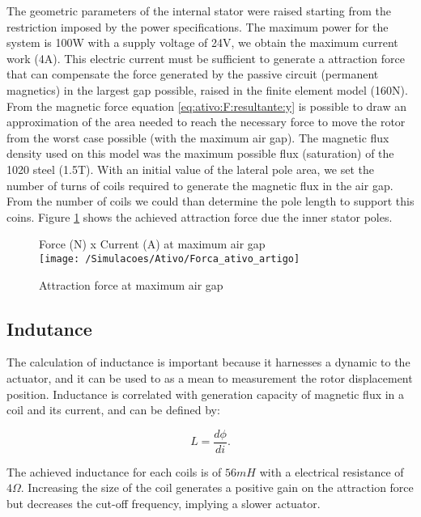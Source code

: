 \documentclass[10pt,fleqn,a4paper,twoside]{article}
\begin{document}
	The geometric parameters of the internal stator were raised starting from the restriction imposed by the power specifications. The maximum power for the system is 100W with a  supply voltage of 24V, we obtain the maximum current work (4A). This electric current must be sufficient to generate a attraction force that can compensate the force generated by the passive circuit (permanent magnetics) in the largest gap possible, raised in the finite element model (160N). From the magnetic force equation \eqref{eq:ativo:F:resultante:y} is possible to draw an approximation of the area needed to reach the necessary force to move the rotor from the worst case possible (with the maximum air gap). The magnetic flux density used on this model was the maximum possible flux (saturation) of the 1020 steel (1.5T). With an initial value of the lateral pole area, we set the number of turns of coils required to generate the magnetic flux in the air gap. From the number of coils we could than determine the pole length to support this coins. Figure \ref{fig:magnetico:ativo:comsol} shows the achieved attraction force due the inner stator poles. 
	
	\begin{figure}
		\centering
		Force (N) x Current (A) at maximum air gap\\
		\texttt{[image: /Simulacoes/Ativo/Forca\_ativo\_artigo]}
		\caption{Attraction force at maximum air gap }
		\label{fig:magnetico:ativo:comsol}
	\end{figure}
	
	\subsection{Indutance} \label{subsec:at:indutancia}
	
	The calculation of inductance is important because it harnesses a dynamic to the actuator, and it can be used to as a mean to measurement the rotor displacement position. Inductance is correlated with generation capacity of magnetic flux in a coil and its current, and can be defined by:
	
	\begin{equation}
		L = \frac{d \phi}{di} .
	\end{equation}
	
	The achieved inductance for each coils is of $56 mH$ with a electrical resistance of $4 \Omega$. Increasing the size of the coil generates a positive gain on the attraction force but decreases the cut-off frequency, implying a slower actuator.
	
\end{document}
